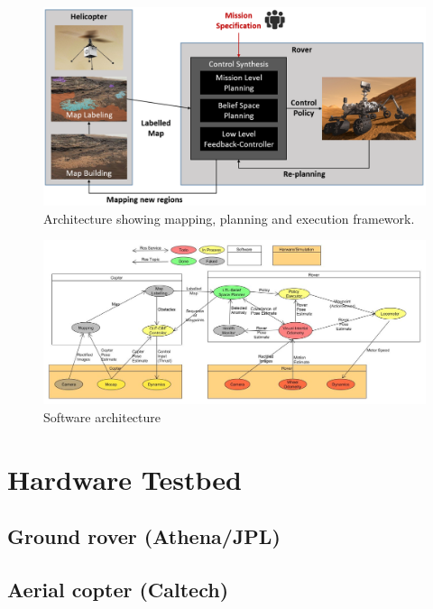 \documentclass[conference]{IEEEtran}
\begin{document}
\begin{figure}[th!]
	\centering
	\includegraphics[width=\columnwidth]{figs/FunctionalArcV4.png}
	\caption{Architecture showing mapping, planning and execution framework.}
	\label{fig:FuncArc}
\end{figure}    	

\begin{figure}
    \centering
    \includegraphics[width=\textwidth]{BeliefSpaceTemporalLogic/figs/SoftwareArch.jpg}
    \caption{Software architecture}
    \label{fig:software_arch}
\end{figure}


\section{Hardware Testbed}

\subsection{Ground rover (Athena/JPL)}


\subsection{Aerial copter (Caltech)}
\end{document}
